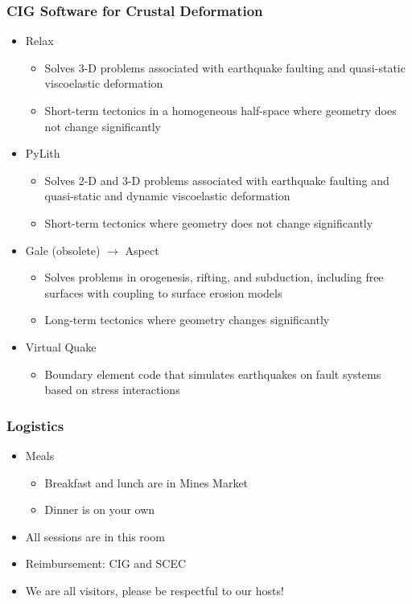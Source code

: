 \documentclass[aspectratio=169]{beamer}
\begin{document}
\begin{frame}
  \frametitle{CIG Software for Crustal Deformation}
  \summary{}

  \begin{itemize}
  \item Relax
    \begin{itemize}
    \item Solves 3-D problems associated with earthquake faulting and
      quasi-static viscoelastic deformation
    \item Short-term tectonics in a homogeneous half-space where
      geometry does not change significantly
    \end{itemize}
  \item PyLith
    \begin{itemize}
    \item Solves 2-D and 3-D problems associated with earthquake
      faulting and quasi-static and dynamic viscoelastic deformation
    \item Short-term tectonics where geometry does not change
      significantly
    \end{itemize}
  \item Gale (obsolete) $\rightarrow$ Aspect
    \begin{itemize}
    \item Solves problems in orogenesis, rifting, and subduction,
      including free surfaces with coupling to surface erosion models
    \item Long-term tectonics where geometry changes significantly
    \end{itemize}
  \item Virtual Quake
    \begin{itemize}
    \item Boundary element code that simulates earthquakes on fault systems based on stress interactions
    \end{itemize}
  \end{itemize}
 
\end{frame}


\begin{frame}
  \frametitle{Logistics}

  \begin{itemize}
  \item Meals
    \begin{itemize}
    \item Breakfast and lunch are in Mines Market
    \item Dinner is on your own
    \end{itemize}
  \item All sessions are in this room
  \item Reimbursement: CIG and SCEC
  \item We are all visitors, please be respectful to our hosts!
  \end{itemize}
  
\end{frame}


 
\end{document}
